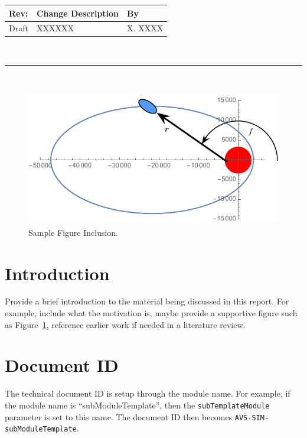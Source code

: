 \documentclass[]{AVSSimReportMemo}
\newcommand{\ModuleName}{subTemplateModule}
\begin{document}
\makeCover


%
%
\pagestyle{empty}
{\renewcommand{\arraystretch}{1.1}
\noindent
\begin{longtable}{|p{0.5in}|p{4.5in}|p{1.14in}|}
\hline
{\bfseries Rev}: & {\bfseries Change Description} & {\bfseries By} \\
\hline
Draft & XXXXXX & X. XXXX \\
\hline

\end{longtable}
}

\newpage
\setcounter{page}{1}
\pagestyle{fancy}

\tableofcontents
~\\ \hrule ~\\

\begin{figure}[htb]
	\centerline{
	\includegraphics[]{Figures/Fig1}
	}
	\caption{Sample Figure Inclusion.}
	\label{fig:Fig1}
\end{figure}

\section{Introduction}
Provide a brief introduction to the material being discussed in this report.  For example, include what the motivation is, maybe provide a supportive figure such as Figure~\ref{fig:Fig1}, reference earlier work if needed in a literature review.


\section{Document ID}
The technical document ID is setup through the module name.  For example, if the module name is ``subModuleTemplate'', then the  {\tt \ModuleName} parameter is set to this name.  The document ID then becomes {\tt AVS-SIM-subModuleTemplate}.  
\end{document}
